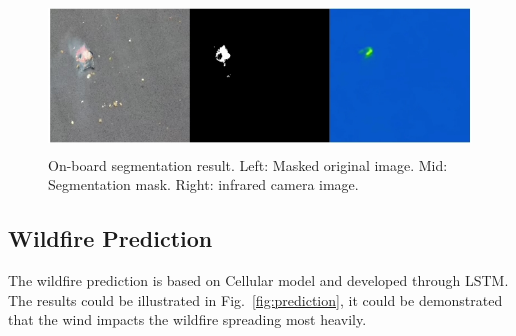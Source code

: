 \begin{figure}[ht]
\centering
\includegraphics[height=40mm]{figs/test.jpg}
\caption{On-board segmentation result. Left: Masked original image. Mid: Segmentation mask. Right: infrared camera image.}
\label{fig:segmentationUAV}
\end{figure}\par
\subsection{Wildfire Prediction}
The wildfire prediction is based on Cellular model and developed through LSTM. The results could be illustrated in Fig.~\ref{fig:prediction}, it could be demonstrated that the wind impacts the wildfire spreading most heavily.
